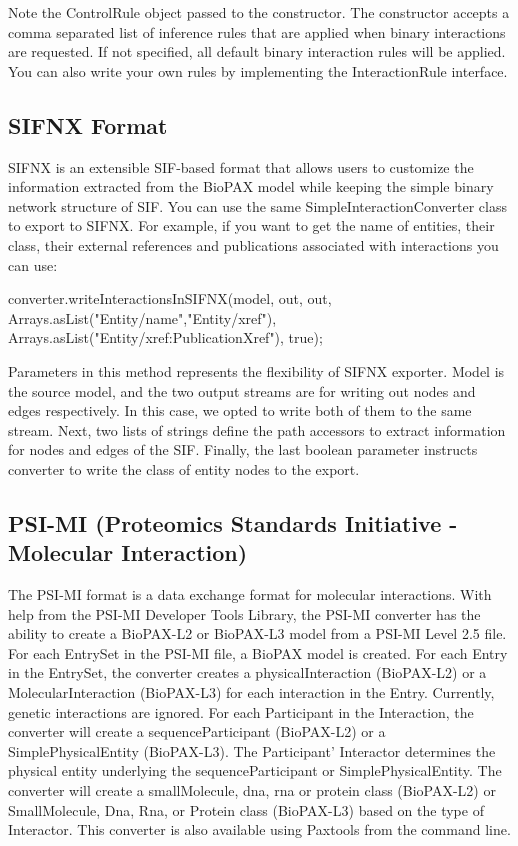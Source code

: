 \documentclass{tufte-book}
\begin{document}
Note the ControlRule object passed to the constructor. The constructor accepts a comma separated list of inference rules that are applied when binary interactions are requested. If not specified, all default binary interaction rules will be applied. You can also write your own rules by implementing the InteractionRule interface. 

\subsection{SIFNX Format}

SIFNX  is an extensible SIF-based format that allows users to customize the information extracted from the BioPAX model while keeping the simple binary network structure of SIF. You can use the same SimpleInteractionConverter class to export to SIFNX. For example, if you want to get the name of entities, their class, their external references and publications associated with interactions you can use:

\begin{javacode}
converter.writeInteractionsInSIFNX(model, 
     out, out, Arrays.asList("Entity/name","Entity/xref"),
    Arrays.asList("Entity/xref:PublicationXref"), true);
\end{javacode}

Parameters in this method represents the flexibility of SIFNX exporter. Model is the source model, and the two output streams are for writing out nodes and edges respectively. In this case, we opted to write both of them to the same stream. Next, two lists of strings define the path accessors to extract information for nodes and edges of the SIF. Finally, the last boolean parameter instructs converter to write the class of entity nodes to the export.

\subsection{PSI-MI (Proteomics Standards Initiative - Molecular Interaction)}
The PSI-MI format is a data exchange format for molecular interactions.  With help from the PSI-MI Developer Tools Library, the PSI-MI converter has the ability to create a BioPAX-L2 or BioPAX-L3 model from a PSI-MI Level 2.5 file.  For each EntrySet in the PSI-MI file, a BioPAX model is created.  For each Entry in the EntrySet, the converter creates a physicalInteraction (BioPAX-L2) or a MolecularInteraction (BioPAX-L3) for each interaction in the Entry.  Currently, genetic interactions are ignored.  For each Participant in the Interaction, the converter will create a sequenceParticipant (BioPAX-L2) or a SimplePhysicalEntity (BioPAX-L3).  The Participant’ Interactor determines the physical entity underlying the sequenceParticipant or SimplePhysicalEntity.  The converter will create a smallMolecule, dna, rna or protein class (BioPAX-L2) or SmallMolecule, Dna, Rna, or Protein class (BioPAX-L3) based on the type of Interactor.  This converter is also available using Paxtools from the command line.
\end{document}
